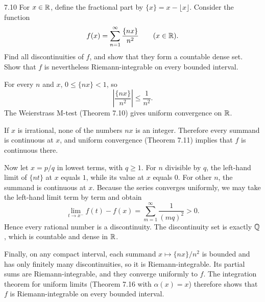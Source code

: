 \documentclass[11pt, oneside]{article}
\begin{document}
\begin{exercise}{7.10}
For $x\in\mathbb{R}$, define the fractional part by $\{x\}=x-\lfloor x\rfloor$. Consider the function
\[
 f(x)=\sum_{n=1}^{\infty}\frac{\{nx\}}{n^2}\qquad(x\in\mathbb{R}).
\]
Find all discontinuities of $f$, and show that they form a countable dense set. Show that $f$ is nevertheless Riemann-integrable on every bounded interval.
\end{exercise}
\begin{solution}
For every $n$ and $x$, $0\le\{nx\}<1$, so
\[
 \left|\frac{\{nx\}}{n^2}\right|\le\frac1{n^2}.
\]
The Weierstrass M-test (Theorem 7.10) gives uniform convergence on $\mathbb{R}$.

If $x$ is irrational, none of the numbers $nx$ is an integer. Therefore every summand is continuous at $x$, and uniform convergence (Theorem 7.11) implies that $f$ is continuous there.

Now let $x=p/q$ in lowest terms, with $q\ge1$. For $n$ divisible by $q$, the left-hand limit of $\{nt\}$ at $x$ equals $1$, while its value at $x$ equals $0$. For other $n$, the summand is continuous at $x$. Because the series converges uniformly, we may take the left-hand limit term by term and obtain
\[
 \lim_{t\to x^-}f(t)-f(x)
 =\sum_{m=1}^{\infty}\frac1{(mq)^2}>0.
\]
Hence every rational number is a discontinuity. The discontinuity set is exactly $\mathbb{Q}$, which is countable and dense in $\mathbb{R}$.

Finally, on any compact interval, each summand $x\mapsto\{nx\}/n^2$ is bounded and has only finitely many discontinuities, so it is Riemann-integrable. Its partial sums are Riemann-integrable, and they converge uniformly to $f$. The integration theorem for uniform limits (Theorem 7.16 with $\alpha(x)=x$) therefore shows that $f$ is Riemann-integrable on every bounded interval.
\end{solution}
\end{document}
